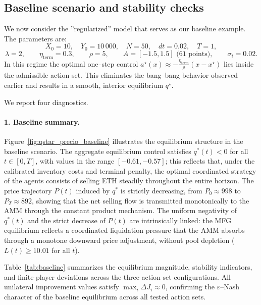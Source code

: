 \documentclass[11pt]{article}
\theoremstyle{definition}
\begin{document}
\subsection*{Baseline scenario and stability checks}
\label{sec:baseline}

We now consider the ''regularized'' model that serves as our baseline example.
The parameters are:
\[
X_0 = 10,\quad 
Y_0 = 10\,000,\quad 
N = 50,\quad
dt = 0.02,\quad T = 1,
\]
\[
\lambda = 2,\qquad
\eta_{\mathrm{term}} = 0.3,\qquad
\rho = 5,\qquad
A = [-1.5,1.5] \text{ (61 points)},\qquad
\sigma_i = 0.02.
\]
In this regime the optimal one--step control 
\(
a^\star(x) \approx -\frac{\eta_{\mathrm{term}}}{\rho}(x - x^\star)
\)
lies inside the admissible action set.  
This eliminates the bang--bang behavior observed earlier and results in a 
smooth, interior equilibrium $q^\star$.

We report four diagnostics.

\paragraph*{1. Baseline summary.}
Figure~\ref{fig:qstar_precio_baseline} illustrates the equilibrium structure in the baseline scenario. The aggregate equilibrium control satisfies $q^*(t) < 0$ for all $t \in [0, T]$, with values in the range $[-0.61, -0.57]$; this reflects that, under the calibrated inventory costs and terminal penalty, the optimal coordinated strategy of the agents consists of selling ETH steadily throughout the entire horizon. The price trajectory $P(t)$ induced by $q^*$ is strictly decreasing, from $P_0 \approx 998$ to $P_T \approx 892$, showing that the net selling flow is transmitted monotonically to the AMM through the constant product mechanism. The uniform negativity of $q^*(t)$ and the strict decrease of $P(t)$ are intrinsically linked: the MFG equilibrium reflects a coordinated liquidation pressure that the AMM absorbs through a monotone downward price adjustment, without pool depletion ($L(t) \geq 10.01$ for all $t$).

Table~\ref{tab:baseline} summarizes the equilibrium magnitude, stability indicators, and finite-player deviations across the three action set configurations.
All unilateral improvement values satisfy $\max_i \Delta J_i \approx 0$, confirming the $\varepsilon$--Nash character of the baseline equilibrium across all tested action sets.
\end{document}
